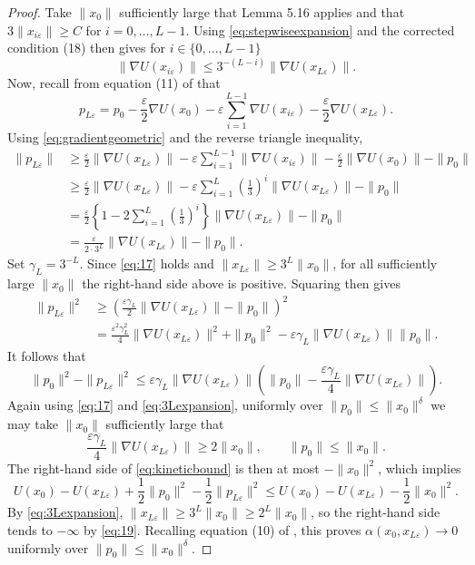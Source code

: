 \begin{proof}
Take $\|x_0\|$ sufficiently large that Lemma 5.16 applies and that
$3\|x_{i\varepsilon}\|\geq C$ for $i=0,\ldots,L-1$. Using
\eqref{eq:stepwiseexpansion} and the corrected condition (18) then gives for $i \in \{0,...,L-1\}$
\begin{equation}
 \|\nabla U(x_{i\varepsilon})\|
 \leq3^{-(L-i)}\|\nabla U(x_{L\varepsilon})\|.
 \label{eq:gradientgeometric}
\end{equation}
Now, recall from equation (11) of \cite{Livingstone2019} that
\[
 p_{L\varepsilon}
 =p_0-\frac{\varepsilon}{2}\nabla U(x_0)
 -\varepsilon\sum_{i=1}^{L-1}\nabla U(x_{i\varepsilon})
 -\frac{\varepsilon}{2}\nabla U(x_{L\varepsilon}).
\]
Using \eqref{eq:gradientgeometric} and the reverse triangle inequality,
\begin{align*}
 \|p_{L\varepsilon}\|
 &\geq
 \frac{\varepsilon}{2}\|\nabla U(x_{L\varepsilon})\|
 -\varepsilon\sum_{i=1}^{L-1}\|\nabla U(x_{i\varepsilon})\|
 -\frac{\varepsilon}{2}\|\nabla U(x_0)\|-\|p_0\|\\
 &\geq
 \frac{\varepsilon}{2}\|\nabla U(x_{L\varepsilon})\|
 -\varepsilon\sum_{i=1}^{L}\left(\frac13\right)^i
 \|\nabla U(x_{L\varepsilon})\|-\|p_0\|\\
 &=
 \frac{\varepsilon}{2}
 \left\{1-2\sum_{i=1}^{L}\left(\frac13\right)^i\right\}
 \|\nabla U(x_{L\varepsilon})\|-\|p_0\|\\
 &=
 \frac{\varepsilon}{2\cdot3^L}
 \|\nabla U(x_{L\varepsilon})\|-\|p_0\|.
\end{align*}
Set $\gamma_L=3^{-L}$. Since \eqref{eq:17} holds and
$\|x_{L\varepsilon}\|\geq3^L\|x_0\|$, for all sufficiently large
$\|x_0\|$ the right-hand side above is positive. Squaring then gives
\begin{align*}
 \|p_{L\varepsilon}\|^2
 &\geq
 \left(
 \frac{\varepsilon\gamma_L}{2}\|\nabla U(x_{L\varepsilon})\|
 -\|p_0\|
 \right)^2\\
 &=
 \frac{\varepsilon^2\gamma_L^2}{4}
 \|\nabla U(x_{L\varepsilon})\|^2
 +\|p_0\|^2
 -\varepsilon\gamma_L
 \|\nabla U(x_{L\varepsilon})\|\|p_0\|.
\end{align*}
It follows that
\begin{equation}
 \|p_0\|^2-\|p_{L\varepsilon}\|^2
 \leq
 \varepsilon\gamma_L\|\nabla U(x_{L\varepsilon})\|
 \left(
 \|p_0\|-\frac{\varepsilon\gamma_L}{4}
 \|\nabla U(x_{L\varepsilon})\|
 \right).
 \label{eq:kineticbound}
\end{equation}
Again using \eqref{eq:17} and \eqref{eq:3Lexpansion}, uniformly over
$\|p_0\|\leq\|x_0\|^\delta$ we may take $\|x_0\|$ sufficiently large that
\[
 \frac{\varepsilon\gamma_L}{4}
 \|\nabla U(x_{L\varepsilon})\|\geq2\|x_0\|,
 \qquad
 \|p_0\|\leq\|x_0\|.
\]
The right-hand side of \eqref{eq:kineticbound} is then at most
$-\|x_0\|^2$, which implies
\[
 U(x_0)-U(x_{L\varepsilon})
 +\frac12\|p_0\|^2-\frac12\|p_{L\varepsilon}\|^2
\leq
 U(x_0)-U(x_{L\varepsilon})-\frac12\|x_0\|^2.
\]
By \eqref{eq:3Lexpansion},
$\|x_{L\varepsilon}\|\geq3^L\|x_0\|\geq2^L\|x_0\|$, so the right-hand
side tends to $-\infty$ by \eqref{eq:19}. Recalling equation (10) of
\cite{Livingstone2019}, this proves
$\alpha(x_0,x_{L\varepsilon})\to0$ uniformly over
$\|p_0\|\leq\|x_0\|^\delta$.
\end{proof}

